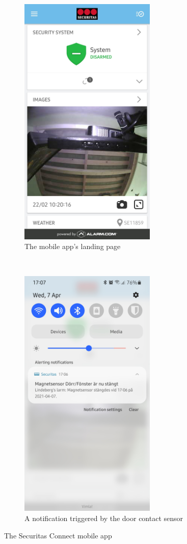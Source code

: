 \begin{figure}[!ht]
    \centering
    \begin{subfigure}[t]{0.5\textwidth}
        \includegraphics[height=4.8in]{images/3-system/mobile-landing-page.png}
        \caption{The mobile app's landing page}
        \label{fig:mobile-landing-page}
    \end{subfigure}%
    ~
    \begin{subfigure}[t]{0.5\textwidth}
        \includegraphics[height=4.8in]{images/3-system/mobile-notification.png}
        \caption{A notification triggered by the door contact sensor}
        \label{fig:mobile-notification}
    \end{subfigure}
    \caption{The Securitas Connect mobile app}
    \label{fig:mobile-application}
\end{figure}

